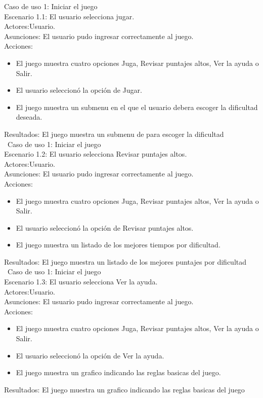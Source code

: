 \documentclass[11pt]{article} %
\begin{document}
Caso de uso 1: Iniciar el juego
\\Escenario 1.1: El usuario selecciona jugar.\
\\Actores:Usuario.\
\\Asunciones: El usuario pudo ingresar correctamente al juego.\
\\Acciones:\
\begin{itemize}
\item El juego muestra cuatro opciones Juga, Revisar puntajes altos, Ver la ayuda o Salir.
\item El usuario seleccionó la opción de Jugar.
\item El juego muestra un submenu en el que el usuario debera escoger la dificultad deseada.
\end {itemize}
Resultados:
El juego muestra un submenu de para escoger la dificultad
\\   \
Caso de uso 1: Iniciar el juego
\\Escenario 1.2: El usuario selecciona Revisar puntajes altos.\
\\Actores:Usuario.\
\\Asunciones: El usuario pudo ingresar correctamente al juego.\
\\Acciones:\
\begin{itemize}
\item El juego muestra cuatro opciones Juga, Revisar puntajes altos, Ver la ayuda o Salir.
\item El usuario seleccionó la opción de Revisar puntajes altos.
\item El juego muestra un listado de los mejores tiempos por dificultad.
\end {itemize}
Resultados:
El juego muestra un listado de los mejores puntajes por dificultad
\\   \
Caso de uso 1: Iniciar el juego
\\Escenario 1.3: El usuario selecciona Ver la ayuda.\
\\Actores:Usuario.\
\\Asunciones: El usuario pudo ingresar correctamente al juego.\
\\Acciones:\
\begin{itemize}
\item El juego muestra cuatro opciones Juga, Revisar puntajes altos, Ver la ayuda o Salir.
\item El usuario seleccionó la opción de Ver la ayuda.
\item El juego muestra un grafico indicando las reglas basicas del juego.
\end {itemize}
Resultados:
El juego muestra un grafico indicando las reglas basicas del juego
\\   \
\end{document}
